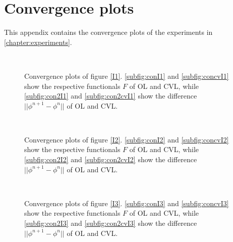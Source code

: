 
\chapter{Convergence plots}\label{AppendixA} %


This appendix contains the convergence plots of the experiments in \cref{chapter:experiments}.

\begin{figure}[h]
  \centering
  ~
  ~
  ~
  \caption{Convergence plots of figure \ref{I1}. \ref{subfig:conI1} and \ref{subfig:concvI1} show the respective functionals $F$ of OL and CVL, while \ref{subfig:con2I1} and \ref{subfig:con2cvI1} show the difference $||\phi^{n+1}-\phi^n||$ of OL and CVL.}\label{I1con}
\end{figure}

\begin{figure}[h]
  \centering
  ~
  ~
  ~
  \caption{Convergence plots of figure \ref{I2}. \ref{subfig:conI2} and \ref{subfig:concvI2} show the respective functionals $F$ of OL and CVL, while \ref{subfig:con2I2} and \ref{subfig:con2cvI2} show the difference $||\phi^{n+1}-\phi^n||$ of OL and CVL.}\label{I2con}
\end{figure}

\begin{figure}[h]
  \centering
  ~
  ~
  ~
  \caption{Convergence plots of figure \ref{I3}. \ref{subfig:conI3} and \ref{subfig:concvI3} show the respective functionals $F$ of OL and CVL, while \ref{subfig:con2I3} and \ref{subfig:con2cvI3} show the difference $||\phi^{n+1}-\phi^n||$ of OL and CVL.}\label{I3con}
\end{figure}

